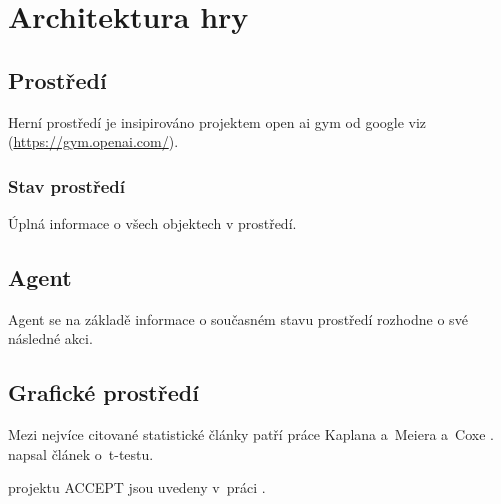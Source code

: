 \chapter{Architektura hry}



\section{Prostředí}

Herní prostředí je insipirováno projektem open ai gym od google viz (\url{https://gym.openai.com/}). 

\subsection{Stav prostředí}
Úplná informace o všech objektech v prostředí.

\section{Agent}
Agent se na základě informace o současném stavu prostředí rozhodne o své následné akci. 


\section{Grafické prostředí}

Mezi nejvíce citované statistické články patří práce Kaplana a~Meiera a~Coxe
\citep{KaplanMeier58, Cox72}. \citet{Student08} napsal článek o~t-testu.

projektu ACCEPT jsou uvedeny v~práci \citet*{Genberget08}.
